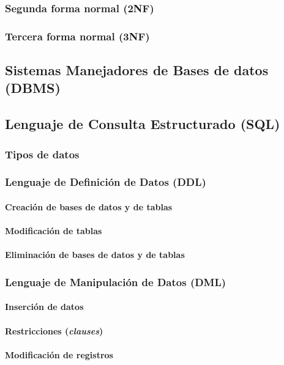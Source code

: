 \documentclass[12pt]{report}
\begin{document}
			\subsubsection{Segunda forma normal (2NF)}
			\subsubsection{Tercera forma normal (3NF)}
		\subsection{Sistemas Manejadores de Bases de datos (DBMS)}
		\subsection{Lenguaje de Consulta Estructurado (SQL)}
			\subsubsection{Tipos de datos}
			\subsubsection{Lenguaje de Definición de Datos (DDL)}
				\paragraph{Creación de bases de datos y de tablas}
				\paragraph{Modificación de tablas}
				\paragraph{Eliminación de bases de datos y de tablas}
			\subsubsection{Lenguaje de Manipulación de Datos (DML)}
				\paragraph{Inserción de datos}
				\paragraph{Restricciones (\textit{clauses})}
				\paragraph{Modificación de registros}
\end{document}

